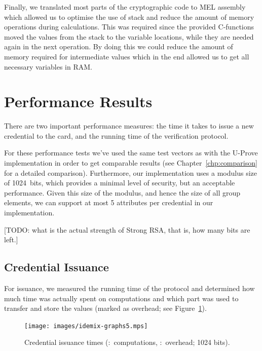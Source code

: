 Finally, we translated most parts of the cryptographic code to MEL assembly
which allowed us to optimise the use of stack and reduce the amount of memory
operations during calculations. This was required since the provided C-functions
moved the values from the stack to the variable locations, while they are needed
again in the next operation. By doing this we could reduce the amount of memory
required for intermediate values which in the end allowed us to get all
necessary variables in RAM.

\section{Performance Results}

There are two important performance measures: the time it takes to issue a new
credential to the card, and the running time of the verification protocol.

For these performance tests we've used the same test vectors as with the U-Prove
implementation in order to get comparable results (see
Chapter~\ref{chp:comparison} for a detailed comparison). Furthermore, our
implementation uses a modulus size of 1024~bits, which provides a minimal level
of security, but an acceptable performance. Given this size of the modulus, and
hence the size of all group elements, we can support at most 5 attributes per
credential in our implementation.

[TODO: what is the actual strength of Strong RSA, that is, how many bits are
left.]

\subsection{Credential Issuance}

For issuance, we measured the running time of the protocol and determined how
much time was actually spent on computations and which part was used to transfer
and store the values (marked as overhead; see Figure~\ref{fig:issuance}).

\begin{figure}[b]
  \centering
  \texttt{[image: images/idemix-graphs5.mps]}

  \caption[Credential issuance times.]{
    Credential issuance times
    (:~computations,
      :~overhead; 1024 bits).}
  \label{fig:issuance}
\end{figure}

